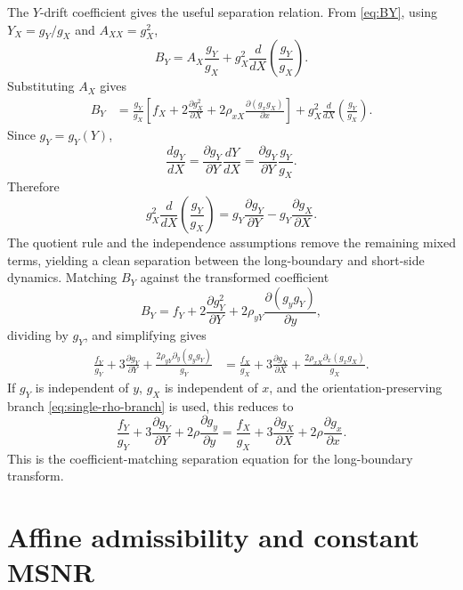 \documentclass[11pt]{article}
\numberwithin{equation}{section}
\begin{document}
The \(Y\)-drift coefficient gives the useful separation relation. From \eqref{eq:BY}, using \(Y_X=g_Y/g_X\) and \(A_{XX}=g_X^2\),
\begin{equation}
\label{eq:BY-substitute}
B_Y
=
A_X\frac{g_Y}{g_X}
+
g_X^2\frac{d}{dX}\left(\frac{g_Y}{g_X}\right).
\end{equation}
Substituting \(A_X\) gives
\begin{align}
\label{eq:BY-expanded}
B_Y
&=
\frac{g_Y}{g_X}
\left[
f_X+2\frac{\partial g_X^2}{\partial X}
+2\rho_{xX}\frac{\partial(g_xg_X)}{\partial x}
\right]
+
g_X^2\frac{d}{dX}\left(\frac{g_Y}{g_X}\right).
\end{align}
Since \(g_Y=g_Y(Y)\),
\[
\frac{dg_Y}{dX}
=
\frac{\partial g_Y}{\partial Y}\frac{dY}{dX}
=
\frac{\partial g_Y}{\partial Y}\frac{g_Y}{g_X}.
\]
Therefore
\begin{equation}
\label{eq:quotient-term}
g_X^2\frac{d}{dX}\left(\frac{g_Y}{g_X}\right)
=
g_Y\frac{\partial g_Y}{\partial Y}
-
g_Y\frac{\partial g_X}{\partial X}.
\end{equation}
The quotient rule and the independence assumptions remove the remaining mixed terms, yielding a clean separation between the long-boundary and short-side dynamics. Matching \(B_Y\) against the transformed coefficient
\[
B_Y=f_Y+2\frac{\partial g_Y^2}{\partial Y}+2\rho_{yY}\frac{\partial(g_yg_Y)}{\partial y},
\]
dividing by \(g_Y\), and simplifying gives
\begin{align}
\label{eq:separated-relation-general}
\frac{f_Y}{g_Y}
+
3\frac{\partial g_Y}{\partial Y}
+
\frac{2\rho_{yY}\partial_y(g_yg_Y)}{g_Y}
&=
\frac{f_X}{g_X}
+
3\frac{\partial g_X}{\partial X}
+
\frac{2\rho_{xX}\partial_x(g_xg_X)}{g_X}.
\end{align}
If \(g_Y\) is independent of \(y\), \(g_X\) is independent of \(x\), and the orientation-preserving branch \eqref{eq:single-rho-branch} is used, this reduces to
\begin{equation}
\label{eq:separated-relation-clean}
\frac{f_Y}{g_Y}
+
3\frac{\partial g_Y}{\partial Y}
+
2\rho\frac{\partial g_y}{\partial y}
=
\frac{f_X}{g_X}
+
3\frac{\partial g_X}{\partial X}
+
2\rho\frac{\partial g_x}{\partial x}.
\end{equation}
This is the coefficient-matching separation equation for the long-boundary transform.

\section{Affine admissibility and constant MSNR}
\end{document}

